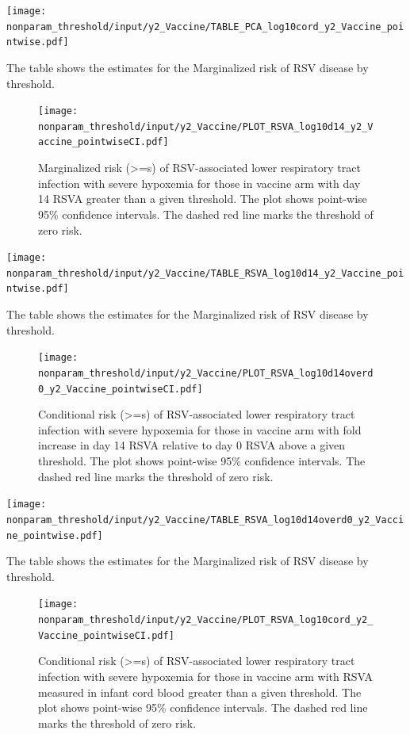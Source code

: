 \documentclass[11pt]{article}
\begin{document}
\begin{table}[H]
    \centering
    \texttt{[image: nonparam\_threshold/input/y2\_Vaccine/TABLE\_PCA\_log10cord\_y2\_Vaccine\_pointwise.pdf]}
    \caption{The table shows the  estimates for the Marginalized risk of RSV disease by threshold. }
\end{table}

\begin{figure}[H]
    \centering
    \texttt{[image: nonparam\_threshold/input/y2\_Vaccine/PLOT\_RSVA\_log10d14\_y2\_Vaccine\_pointwiseCI.pdf]}
   \caption{Marginalized risk (>=s) of RSV-associated lower respiratory tract infection with severe hypoxemia for those in vaccine arm with day 14 RSVA greater than a given threshold. The plot shows point-wise 95\% confidence intervals. The dashed red line marks the threshold of zero risk.}
\end{figure}

\begin{table}[H]
    \centering
    \texttt{[image: nonparam\_threshold/input/y2\_Vaccine/TABLE\_RSVA\_log10d14\_y2\_Vaccine\_pointwise.pdf]}
    \caption{The table shows the  estimates for the Marginalized risk of RSV disease by threshold. }
\end{table}

\begin{figure}[H]
    \centering
    \texttt{[image: nonparam\_threshold/input/y2\_Vaccine/PLOT\_RSVA\_log10d14overd0\_y2\_Vaccine\_pointwiseCI.pdf]}
    \caption{Conditional risk (>=s) of RSV-associated lower respiratory tract infection with severe hypoxemia for those in vaccine arm with fold increase in day 14 RSVA relative to day 0 RSVA above a given threshold. The plot shows point-wise 95\% confidence intervals. The dashed red line marks the threshold of zero risk.}
\end{figure}

\begin{table}[H]
    \centering
    \texttt{[image: nonparam\_threshold/input/y2\_Vaccine/TABLE\_RSVA\_log10d14overd0\_y2\_Vaccine\_pointwise.pdf]}
    \caption{The table shows the  estimates for the Marginalized risk of RSV disease by threshold. }
\end{table}

\begin{figure}[H]
    \centering
    \texttt{[image: nonparam\_threshold/input/y2\_Vaccine/PLOT\_RSVA\_log10cord\_y2\_Vaccine\_pointwiseCI.pdf]}
   \caption{Conditional risk (>=s) of RSV-associated lower respiratory tract infection with severe hypoxemia for those in vaccine arm with RSVA measured in infant cord blood greater than a given threshold. The plot shows point-wise 95\% confidence intervals. The dashed red line marks the threshold of zero risk.}
\end{figure}
\end{document}
